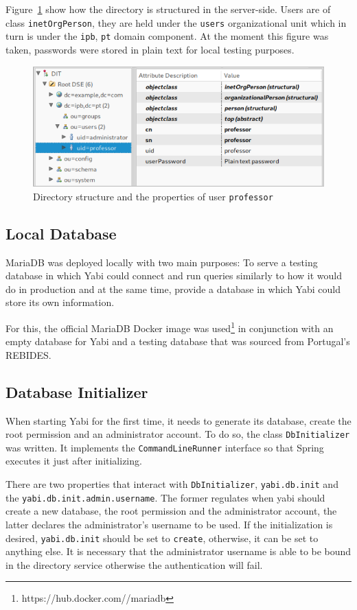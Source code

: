 Figure~\ref{fig:adsconfig} show how the directory is structured in the server-side. Users are of class \texttt{inetOrgPerson}, they are held under the \texttt{users} organizational unit which in turn is under the \texttt{ipb}, \texttt{pt} domain component. At the moment this figure was taken, passwords were stored in plain text for local testing purposes.

\begin{figure}
  \centering
  \includegraphics[width=.8\textwidth]{images/screenshots/ldap-directory}
  \caption{Directory structure and the properties of user \texttt{professor}}\label{fig:adsconfig}
\end{figure}

\subsection{Local Database}\label{ldb}
MariaDB was deployed locally with two main purposes: To serve a testing database in which \gls{Yabi} could connect and run queries similarly to how it would do in production and at the same time, provide a database in which \gls{Yabi} could store its own information.

For this, the official MariaDB Docker image was used\footnote{https://hub.docker.com/\textunderscore/mariadb} in conjunction with an empty database for \gls{Yabi} and a testing database that was sourced from Portugal's \gls{REBIDES}.


\subsection{Database Initializer}\label{dbinit}
When starting \gls{Yabi} for the first time, it needs to generate its database, create the root permission and an administrator account.
To do so, the class \texttt{DbInitializer} was written. It implements the \texttt{CommandLineRunner} interface so that Spring executes it just after initializing.

There are two properties that interact with \texttt{DbInitializer}, \texttt{yabi.db.init} and the \texttt{yabi.db.init.admin.username}. The former regulates when yabi should create a new database, the root permission and the administrator account, the latter declares the administrator's username to be used. If the initialization is desired, \texttt{yabi.db.init} should be set to \texttt{create}, otherwise, it can be set to anything else. It is necessary that the administrator username is able to be bound in the directory service otherwise the authentication will fail.

